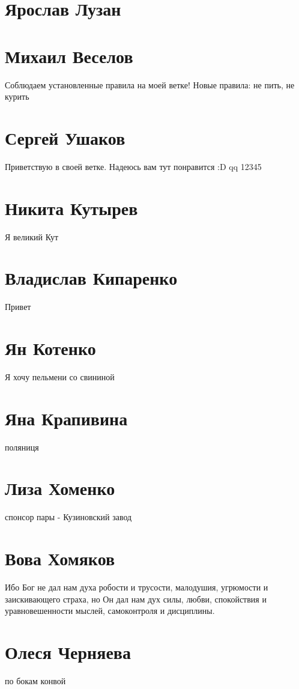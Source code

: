 \documentclass{article}
\begin{document}
\section*{Ярослав Лузан}

\section*{Михаил Веселов}

Соблюдаем установленные правила на моей ветке!
Новые правила: не пить, не курить

\section*{Сергей Ушаков}

Приветствую в своей ветке. Надеюсь вам тут понравится :D qq 12345

\section*{Никита Кутырев}
Я великий Кут
\section*{Владислав Кипаренко}
Привет
\section*{Ян Котенко}
Я хочу пельмени со свининой
\section*{Яна Крапивина}

поляниця
\section*{Лиза Хоменко}
спонсор пары - Кузиновский завод

\section*{Вова Хомяков}
Ибо Бог не дал нам духа робости и трусости, малодушия, угрюмости и заискивающего страха, но Он дал нам дух силы, любви, спокойствия и уравновешенности мыслей, самоконтроля и дисциплины.
\section*{Олеся Черняева}
по бокам конвой
\end{document}
